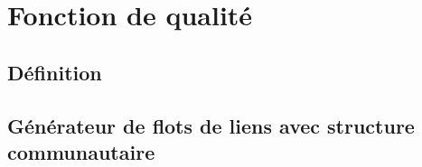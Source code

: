 \chapter{Fonction de qualité}
\minitoc
\section{Définition}
\section{Générateur de flots de liens avec structure communautaire}